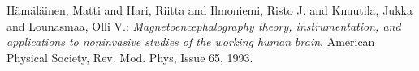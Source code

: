 \documentclass[10pt,letterpaper]{article}
\begin{document}
\begin{thebibliography}{9}

  H\"am\"al\"ainen, Matti and Hari, Riitta and Ilmoniemi, Risto J. and Knuutila, Jukka and Lounasmaa, Olli V.:
  \emph{Magnetoencephalography theory, instrumentation, and applications
to noninvasive studies of the working human brain}.
  American Physical Society,
  Rev. Mod. Phys, Issue 65,
  1993.

\end{thebibliography}
\end{document}

